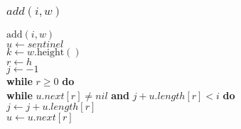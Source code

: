 \documentclass{beamer}
\begin{document}
\begin{frame}[shrink]
\frametitle{$add(i,w)$}
\begin{oframed}
\begin{flushleft}
\hspace*{1em} \ensuremath{\mathrm{add}(\ensuremath{\mathit{i}}, \ensuremath{\mathit{w}})}\\
\hspace*{1em} \hspace*{1em} \ensuremath{\ensuremath{\mathit{u}} \gets  \ensuremath{sentinel}}\\
\hspace*{1em} \hspace*{1em} \ensuremath{\ensuremath{\mathit{k}} \gets  \ensuremath{\ensuremath{\mathit{w}}.\mathrm{height}()}}\\
\hspace*{1em} \hspace*{1em} \ensuremath{\ensuremath{\mathit{r}} \gets  \ensuremath{h}}\\
\hspace*{1em} \hspace*{1em} \ensuremath{\ensuremath{\mathit{j}} \gets  \ensuremath{-1}}\\
\hspace*{1em} \hspace*{1em} {\color{black} \textbf{while}} \ensuremath{\ensuremath{\mathit{r}} \ge 0} {\color{black} \textbf{do}} \\
\hspace*{1em} \hspace*{1em} \hspace*{1em} {\color{black} \textbf{while}} \ensuremath{\ensuremath{\mathit{u}}.\ensuremath{\mathit{next}}[\ensuremath{\mathit{r}}] \ne nil} {\color{black} \textbf{and}} \ensuremath{\ensuremath{\mathit{j}}+\ensuremath{\mathit{u}}.\ensuremath{\mathit{length}}[\ensuremath{\mathit{r}}] < i} {\color{black} \textbf{do}} \\
\hspace*{1em} \hspace*{1em} \hspace*{1em} \hspace*{1em} \ensuremath{\ensuremath{\mathit{j}} \gets  \ensuremath{\ensuremath{\mathit{j}} + \ensuremath{\mathit{u}}.\ensuremath{\mathit{length}}[\ensuremath{\mathit{r}}]}}\\
\hspace*{1em} \hspace*{1em} \hspace*{1em} \hspace*{1em} \ensuremath{\ensuremath{\mathit{u}} \gets  \ensuremath{\ensuremath{\mathit{u}}.\ensuremath{\mathit{next}}[\ensuremath{\mathit{r}}]}}\\

\end{flushleft}
\end{oframed}
\end{frame}
\end{document}

